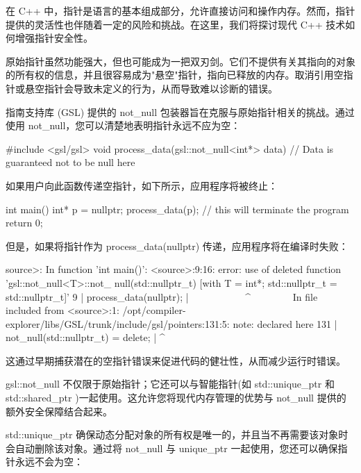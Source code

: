 
在 C++ 中，指针是语言的基本组成部分，允许直接访问和操作内存。然而，指针提供的灵活性也伴随着一定的风险和挑战。在这里，我们将探讨现代 C++ 技术如何增强指针安全性。


原始指针虽然功能强大，但也可能成为一把双刃剑。它们不提供有关其指向的对象的所有权的信息，并且很容易成为"悬空"指针，指向已释放的内存。取消引用空指针或悬空指针会导致未定义的行为，从而导致难以诊断的错误。


指南支持库 (GSL) 提供的 not\_null 包装器旨在克服与原始指针相关的挑战。通过使用 not\_null，您可以清楚地表明指针永远不应为空：

\begin{cpp}
#include <gsl/gsl>
void process_data(gsl::not_null<int*> data) {
    // Data is guaranteed not to be null here
}
\end{cpp}

如果用户向此函数传递空指针，如下所示，应用程序将被终止：

\begin{cpp}
int main() {
    int* p = nullptr;
    process_data(p); // this will terminate the program
    return 0;
}
\end{cpp}

但是，如果将指针作为 process\_data(nullptr) 传递，应用程序将在编译时失败：

\begin{shell}
source>: In function 'int main()':
<source>:9:16: error: use of deleted function 'gsl::not_null<T>::not_
null(std::nullptr_t) [with T = int*; std::nullptr_t = std::nullptr_t]'
    9 | process_data(nullptr);
      | ~~~~~~~~~~~^~~~~~~~~
In file included from <source>:1:
/opt/compiler-explorer/libs/GSL/trunk/include/gsl/pointers:131:5:
note: declared here
  131 | not_null(std::nullptr_t) = delete;
      | ^~~~~~~~
\end{shell}

这通过早期捕获潜在的空指针错误来促进代码的健壮性，从而减少运行时错误。


gsl::not\_null 不仅限于原始指针；它还可以与智能指针(如 std::unique\_ptr 和 std::shared\_ptr )一起使用。这允许您将现代内存管理的优势与 not\_null 提供的额外安全保障结合起来。


std::unique\_ptr 确保动态分配对象的所有权是唯一的，并且当不再需要该对象时会自动删除该对象。通过将 not\_null 与 unique\_ptr 一起使用，您还可以确保指针永远不会为空：

